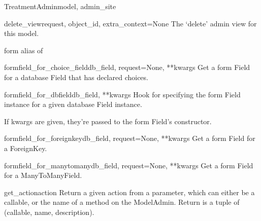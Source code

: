 \documentclass[letterpaper,10pt,english]{sphinxmanual}
\begin{document}
\begin{classdesc}{TreatmentAdmin}{model, admin\_site}
\hypertarget{data.admin.TreatmentAdmin.delete_view}{}\begin{methoddesc}{delete\_view}{request, object\_id, extra\_context=None}
The `delete' admin view for this model.
\end{methoddesc}

\hypertarget{data.admin.TreatmentAdmin.form}{}\begin{memberdesc}{form}
alias of 
\end{memberdesc}

\hypertarget{data.admin.TreatmentAdmin.formfield_for_choice_field}{}\begin{methoddesc}{formfield\_for\_choice\_field}{db\_field, request=None, **kwargs}
Get a form Field for a database Field that has declared choices.
\end{methoddesc}

\hypertarget{data.admin.TreatmentAdmin.formfield_for_dbfield}{}\begin{methoddesc}{formfield\_for\_dbfield}{db\_field, **kwargs}
Hook for specifying the form Field instance for a given database Field
instance.

If kwargs are given, they're passed to the form Field's constructor.
\end{methoddesc}

\hypertarget{data.admin.TreatmentAdmin.formfield_for_foreignkey}{}\begin{methoddesc}{formfield\_for\_foreignkey}{db\_field, request=None, **kwargs}
Get a form Field for a ForeignKey.
\end{methoddesc}

\hypertarget{data.admin.TreatmentAdmin.formfield_for_manytomany}{}\begin{methoddesc}{formfield\_for\_manytomany}{db\_field, request=None, **kwargs}
Get a form Field for a ManyToManyField.
\end{methoddesc}

\hypertarget{data.admin.TreatmentAdmin.get_action}{}\begin{methoddesc}{get\_action}{action}
Return a given action from a parameter, which can either be a callable,
or the name of a method on the ModelAdmin.  Return is a tuple of
(callable, name, description).
\end{methoddesc}


\end{classdesc}
\end{document}
